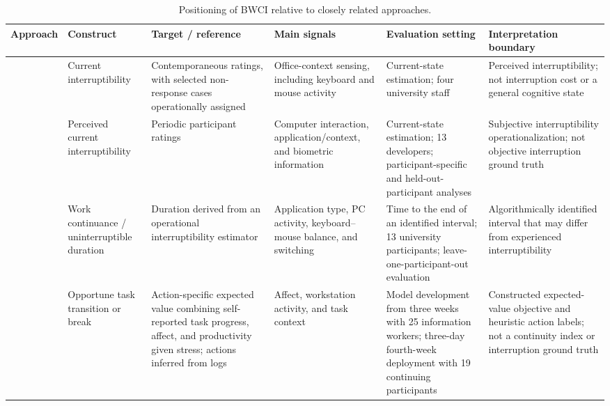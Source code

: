\begin{table}[htbp]
\centering
\caption{Positioning of BWCI relative to closely related approaches.}
\label{tab:related-work-positioning}

\begingroup
\scriptsize
\setlength{\tabcolsep}{2pt}
\renewcommand{\arraystretch}{1.05}

\begin{tabularx}{\textwidth}{
@{}
>{\raggedright\arraybackslash}p{}
>{\raggedright\arraybackslash}p{}
Y
Y
>{\raggedright\arraybackslash}p{0.17\textwidth}
Y
@{}
}
\toprule


\textbf{Approach} &
\textbf{Construct} &
\textbf{Target / reference} &
\textbf{Main signals} &
\textbf{Evaluation setting} &
\textbf{Interpretation boundary} \\

\midrule

\textcite{fogarty2005interruptibility} &
Current interruptibility &
Contemporaneous ratings, with selected non-response cases
operationally assigned &
Office-context sensing, including keyboard and mouse activity &
Current-state estimation; four university staff &
Perceived interruptibility; not interruption cost or a general
cognitive state \\

\addlinespace

\textcite{zueger2018sensing} &
Perceived current interruptibility &
Periodic participant ratings &
Computer interaction, application/context, and biometric information &
Current-state estimation; 13 developers; participant-specific and
held-out-participant analyses &
Subjective interruptibility operationalization; not objective
interruption ground truth \\

\addlinespace

\textcite{shiratori2020workContinuance} &
Work continuance / uninterruptible duration &
Duration derived from an operational interruptibility estimator &
Application type, PC activity, keyboard--mouse balance, and switching &
Time to the end of an identified interval; 13 university participants;
leave-one-participant-out evaluation &
Algorithmically identified interval that may differ from experienced
interruptibility \\

\addlinespace

\textcite{kaur2020transitionsBreaks} &
Opportune task transition or break &
Action-specific expected value combining self-reported task progress,
affect, and productivity given stress; actions inferred from logs &
Affect, workstation activity, and task context &
Model development from three weeks with 25 information workers;
three-day fourth-week deployment with 19 continuing participants &
Constructed expected-value objective and heuristic action labels; not a
continuity index or interruption ground truth \\


\end{tabularx}
\end{table}
